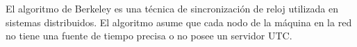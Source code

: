 El algoritmo de Berkeley es una técnica de sincronización de reloj utilizada en sistemas distribuidos. El algoritmo asume que cada nodo de la máquina en la red no tiene una fuente de tiempo precisa o no posee un servidor UTC.\@
